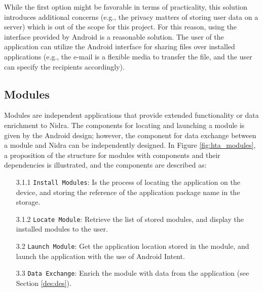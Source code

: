 While the first option might be favorable in terms of practicality, this solution introduces additional concerns (e.g., the privacy matters of storing user data on a server) which is out of the scope for this project. For this reason, using the interface provided by Android is a reasonable solution. The user of the application can utilize the Android interface for sharing files over installed applications (e.g., the e-mail is a flexible media to transfer the file, and the user can specify the recipients accordingly).  



\subsection{Modules}\label{soc:modules}

Modules are independent applications that provide extended functionality or data enrichment to Nidra. The components for locating and launching a module is given by the Android design; however, the component for data exchange between a module and Nidra can be independently designed.  In Figure \ref{fig:hta_modules}, a proposition of the structure for modules with components and their dependencies is illustrated, and the components are described as:

\begin{itemize}
    \item[3.1.1] \verb|Install Modules|: Is the process of locating the application on the device, and storing the reference of the application package name in the storage.  
    \item[3.1.2] \verb|Locate Module|: Retrieve the list of stored modules, and display the installed modules to the user. 
    \item[3.2] \verb|Launch Module|: Get the application location stored in the module, and launch the application with the use of Android Intent. 
    \item[3.3] \verb|Data Exchange|: Enrich the module with data from the application (see Section \ref{des:des}).
\end{itemize}


